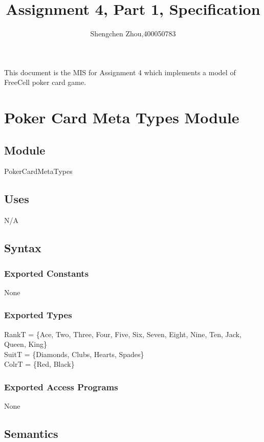 \documentclass[12pt]{article}
\title{Assignment 4, Part 1, Specification}
\author{Shengchen Zhou,400050783}
\begin{document}
\maketitle

This document is the MIS for Assignment 4 which implements a model of FreeCell poker card game.


\newpage

\section* {Poker Card Meta Types Module}

\subsection*{Module}

PokerCardMetaTypes

\subsection* {Uses}

N/A

\subsection* {Syntax}

\subsubsection* {Exported Constants}

None

\subsubsection* {Exported Types}

RankT = \{Ace, Two, Three, Four, Five, Six, Seven, Eight, Nine, Ten, Jack, Queen, King\}\\ 
SuitT = \{Diamonds, Clubs, Hearts, Spades\}\\
ColrT = \{Red, Black\}

\subsubsection* {Exported Access Programs}

None

\subsection* {Semantics}
\end{document}
